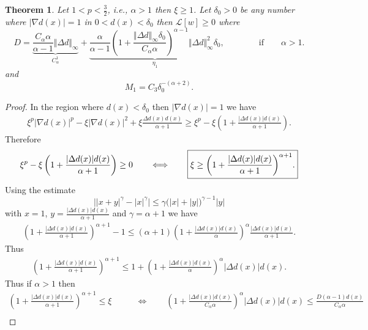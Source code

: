 \documentclass[10pt]{article}
\theoremstyle{plain}
\newtheorem{thm}{Theorem}
\theoremstyle{remark}
\begin{document}
\begin{thm} Let $1<p<\frac{3}{2}$, i.e., $\alpha>1$ then $\xi\geq 1$. Let $\delta_0>0$ be any number where $|\nabla d(x)|=1$ in $0<d(x)<\delta_0$ then $\mathcal{L}[w]\geq 0$ where
\begin{equation*}
    D = \underbrace{\frac{C_\alpha\alpha}{\alpha-1}\Vert \Delta d\Vert_{\infty}}_{C^1_{\alpha}} +  \underbrace{\frac{\alpha}{\alpha-1}\left(1+\frac{\Vert \Delta d\Vert_{\infty}\delta_0}{C_\alpha \alpha}\right)^{\alpha-1}\Vert \Delta d\Vert_\infty^2\delta_0}_{\eta_1}, \qquad\qquad \text{if}\qquad \alpha > 1.
\end{equation*}
and 
\begin{equation*}
    M_1 = C_3\delta_0^{-(\alpha+2)}.
\end{equation*}
\end{thm}
\begin{proof} In the region where $d(x)<\delta_0$ then $|\nabla d(x)| = 1$ we have
\begin{equation*}
    \begin{split}
        \xi^p|\nabla d(x)|^p  - \xi |\nabla d(x)|^2 + \xi\frac{\Delta d(x)d(x)}{\alpha+1} \geq \xi^p - \xi\left(1+\frac{|\Delta d(x)|d(x)}{\alpha+1}\right).
    \end{split}
\end{equation*}
Therefore
\begin{equation*}
    \xi^p - \xi\left(1+\frac{|\Delta d(x)|d(x)}{\alpha+1}\right) \geq 0 \qquad\Longleftrightarrow\qquad \fbox{$\displaystyle\xi \geq \left(1+\frac{|\Delta d(x)|d(x)}{\alpha+1}\right)^{\alpha+1}$.}
\end{equation*}
Using the estimate
\begin{equation*}
    \Big||x+y|^\gamma - |x|^\gamma\Big| \leq \gamma \Big(|x|+|y|\Big)^{\gamma-1}|y|
\end{equation*}
with $x=1$, $y = \frac{|\Delta d(x)|d(x)}{\alpha+1}$ and $\gamma = \alpha+1$ we have
\begin{align*}
    \left(1+\frac{|\Delta d(x)|d(x)}{\alpha+1}\right)^{\alpha+1} - 1 \leq (\alpha+1)\left(1+\frac{|\Delta d(x)|d(x)}{\alpha}\right)^\alpha\frac{|\Delta d(x)|d(x)}{\alpha+1}.
\end{align*}
Thus
\begin{align*}
    \left(1+\frac{|\Delta d(x)|d(x)}{\alpha+1}\right)^{\alpha+1}\leq 1+\left(1+\frac{|\Delta d(x)|d(x)}{\alpha}\right)^\alpha|\Delta d(x)|d(x).
\end{align*}
Thus if $\alpha>1$ then
\begin{align*}
    \left(1+\frac{|\Delta d(x)|d(x)}{\alpha+1}\right)^{\alpha+1} \leq \xi &\qquad\Longleftrightarrow\qquad  \left(1+\frac{|\Delta d(x)|d(x)}{C_\alpha\alpha}\right)^\alpha|\Delta d(x)|d(x)\leq \frac{D(\alpha-1)d(x)}{C_\alpha\alpha}\\

\end{align*}
\end{proof}
\end{document}

